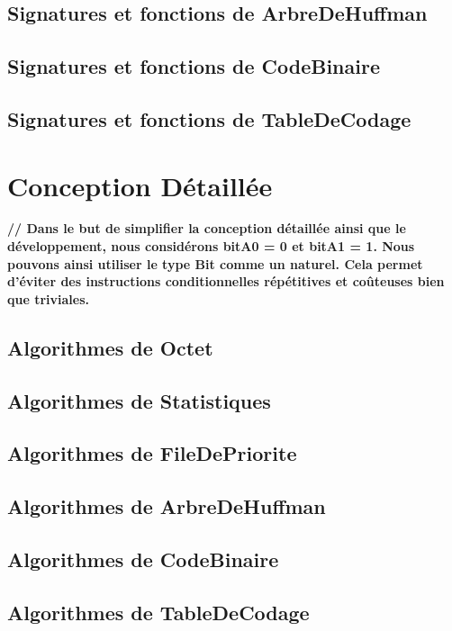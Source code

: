             \subsection{Signatures et fonctions de ArbreDeHuffman}
                
            \subsection{Signatures et fonctions de CodeBinaire}
                
            \subsection{Signatures et fonctions de TableDeCodage}
                

        \newpage
        \section{Conception Détaillée}
            \textbf{// Dans le but de simplifier la conception détaillée ainsi que le développement, nous considérons bitA0 = 0 et bitA1 = 1. Nous pouvons ainsi utiliser le type Bit comme un naturel. Cela permet d'éviter des instructions conditionnelles répétitives et coûteuses bien que triviales.}
            \subsection{Algorithmes de Octet}
                
            \subsection{Algorithmes de Statistiques}
                
            \subsection{Algorithmes de FileDePriorite}
                
            \subsection{Algorithmes de ArbreDeHuffman}
                
            \subsection{Algorithmes de CodeBinaire}
                
            \subsection{Algorithmes de TableDeCodage}
                